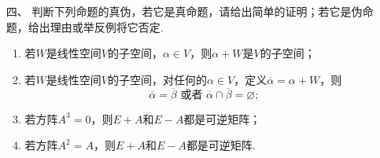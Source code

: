 \begin{enumerate}
	\item[四、]判断下列命题的真伪，若它是真命题，请给出简单的证明；若它是伪命题，给出理由或举反例将它否定.
	\begin{enumerate}[label=(\arabic*)]
        \item 若$W$是线性空间$V$的子空间，$\alpha\in V$，则$\alpha+W$是$V$的子空间；
        \item 若$W$是线性空间$V$的子空间，对任何的$\alpha\in V$，定义$\overline{\alpha}=\alpha+W$，则
        \[\overline{\alpha}=\overline{\beta}\text{ 或者 }\overline{\alpha}\cap\overline{\beta}=\varnothing;\]
        \item 若方阵$A^3=0$，则$E+A$和$E-A$都是可逆矩阵；
        \item 若方阵$A^2=A$，则$E+A$和$E-A$都是可逆矩阵.
    \end{enumerate}
\end{enumerate}

\clearpage
